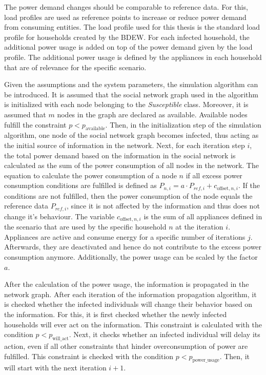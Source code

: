 The power demand changes should be comparable to reference data.
For this, load profiles are used as reference points to increase
or reduce power demand from consuming entities.
The load profile used for this thesis is the standard load profile
for households created by the BDEW.
For each infected household, the additional power usage is 
added on top of the power demand given by the load profile.
The additional power usage is defined by the appliances in each
household that are of relevance for the specific scenario. 

Given the assumptions and the system parameters, the simulation 
algorithm can be introduced. 
It is assumed that the social network graph used in the algorithm
is initialized with each node belonging to the \textit{Susceptible} class.
Moreover, it is assumed that $m$ nodes in the graph are declared
as available. Available nodes fulfill the constraint 
$p < p_{\mathrm{available}}$.
Then, in the initialization step of the simulation algorithm,
one node of the social network graph becomes infected,
thus acting as the initial source of information in the network.
Next, for each iteration step $i$, the total power demand 
based on the information in the social network is calculated 
as the sum of the power consumption of all nodes in the network. 
The equation to calculate the power consumption 
of a node $n$ if all excess power consumption conditions are fulfilled
is defined as 
$P_{n,i}=a \cdot P_{ref, i}+c_{\mathrm{offset}, n, i}$. 
If the conditions are not fulfilled, then the power consumption of the node 
equals the reference data $P_{ref, i}$, since it is 
not affected by the information and thus does not change it's
behaviour.
The variable $c_{\mathrm{offset}, n, i}$
is the sum of all appliances defined in the 
scenario that are used by the 
specific household $n$ at the iteration $i$.
Appliances are active and consume energy 
for a specific number of iterations $j$.
Afterwards, they are deactivated and hence do not contribute to 
the excess power consumption anymore.
Additionally, the power usage can be 
scaled by the factor $a$.

After the calculation of the power usage, the information is 
propagated in the network graph. 
After each iteration of the information propagation algorithm,
it is checked whether the infected individuals will change their behavior
based on the information. For this, it is first checked whether
the newly infected households will ever act on the information.
This constraint is calculated with the condition
$p<p_{\mathrm{will\_act}}$.
Next, it checks whether
an infected individual will delay its action, even if
all other constraints that hinder overconsumption of power
are fulfilled. This constraint is checked with the
condition $p<p_{\mathrm{power\_usage}}$. 
Then, it will start with the next iteration $i+1$.

